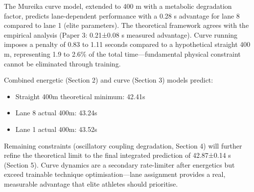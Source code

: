 The Mureika curve model, extended to 400 m with a metabolic degradation factor, predicts lane-dependent performance with a 0.28 s advantage for lane 8 compared to lane 1 (elite parameters). The theoretical framework agrees with the empirical analysis (Paper 3: 0.21±0.08 s measured advantage). Curve running imposes a penalty of 0.83 to 1.11 seconds compared to a hypothetical straight 400 m, representing 1.9 to 2.6\% of the total time—fundamental physical constraint cannot be eliminated through training.

Combined energetic (Section 2) and curve (Section 3) models predict:
\begin{itemize}
    \item Straight 400m theoretical minimum: 42.41s
    \item Lane 8 actual 400m: 43.24s
    \item Lane 1 actual 400m: 43.52s
\end{itemize}

Remaining constraints (oscillatory coupling degradation, Section 4) will further refine the theoretical limit to the final integrated prediction of 42.87±0.14 s (Section 5). Curve dynamics are a secondary rate-limiter after energetics but exceed trainable technique optimisation—lane assignment provides a real, measurable advantage that elite athletes should prioritise.
